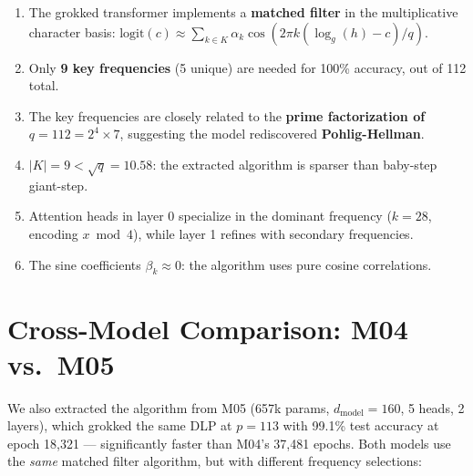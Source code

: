 \documentclass[11pt]{article}
\newcommand{\logg}{\log_g}
\begin{document}
\begin{enumerate}[leftmargin=*]
    \item The grokked transformer implements a \textbf{matched filter} in the multiplicative character basis: $\text{logit}(c) \approx \sum_{k \in K} \alpha_k \cos(2\pi k (\logg(h) - c)/q)$.
    \item Only \textbf{9 key frequencies} (5 unique) are needed for 100\% accuracy, out of 112 total.
    \item The key frequencies are closely related to the \textbf{prime factorization of $q = 112 = 2^4 \times 7$}, suggesting the model rediscovered \textbf{Pohlig-Hellman}.
    \item $|K| = 9 < \sqrt{q} = 10.58$: the extracted algorithm is sparser than baby-step giant-step.
    \item Attention heads in layer 0 specialize in the dominant frequency ($k = 28$, encoding $x \bmod 4$), while layer 1 refines with secondary frequencies.
    \item The sine coefficients $\beta_k \approx 0$: the algorithm uses pure cosine correlations.
\end{enumerate}


\section{Cross-Model Comparison: M04 vs.\ M05}

We also extracted the algorithm from M05 (657k params, $d_{\text{model}} = 160$, 5 heads, 2 layers), which grokked the same DLP at $p = 113$ with 99.1\% test accuracy at epoch 18,321 --- significantly faster than M04's 37,481 epochs. Both models use the \emph{same} matched filter algorithm, but with different frequency selections:
\end{document}
